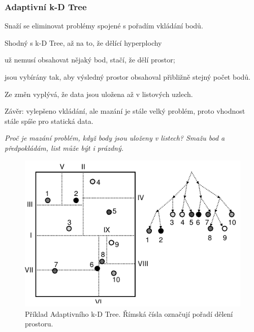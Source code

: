 \subsubsection{Adaptivní k-D Tree}

\begin{compactitem}
    \item Snaží se eliminovat problémy spojené s pořadím vkládání bodů.

    \item Shodný s k-D Tree, až na to, že dělící hyperplochy
    \begin{compactitem}
        \item už nemusí obsahovat nějaký bod, stačí, že dělí prostor;
        \item jsou vybírány tak, aby výsledný prostor obsahoval přibližně stejný počet bodů.
    \end{compactitem}

    \item Ze změn vyplývá, že data jsou uložena až v listových uzlech.

    \item Závěr: vylepšeno vkládání, ale mazání je stále velký problém, proto vhodnost stále spíše pro statická data. \begin{compactitem}
        \item \textit{Proč je mazání problém, když body jsou uloženy v listech? Smažu bod a předpokládám, list může být i prázdný.}
    \end{compactitem}
\end{compactitem}

\begin{figure}[H]
    \centering
    \includegraphics[width=0.75\linewidth]{adaptivni_kd_tree.pdf}
    \caption{Příklad Adaptivního k-D Tree. Římská čísla označují pořadí dělení prostoru.}
\end{figure}

